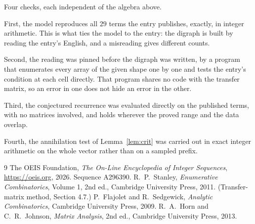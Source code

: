\documentclass[11pt,a4paper]{article}
\theoremstyle{plain}
\theoremstyle{definition}
\begin{document}
Four checks, each independent of the algebra above.

First, the model reproduces all $29$ terms the entry publishes, exactly, in integer
arithmetic. This is what ties the model to the entry: the digraph is built by reading the
entry's English, and a misreading gives different counts.

Second, the reading was pinned before the digraph was written, by a program that enumerates
every array of the given shape one by one and tests the entry's condition at each cell
directly. That program shares no code with the transfer matrix, so an error in one does not
hide an error in the other.

Third, the conjectured recurrence was evaluated directly on the published terms, with no
matrices involved, and holds wherever the proved range and the data overlap.

Fourth, the annihilation test of Lemma~\ref{lem:crit} was carried out in exact integer
arithmetic on the whole vector rather than on a sampled prefix.

\begin{thebibliography}{9}
 The OEIS Foundation, \emph{The On-Line Encyclopedia of Integer
Sequences}, \url{https://oeis.org}, 2026. Sequence A296390.
 R.~P.~Stanley, \emph{Enumerative Combinatorics}, Volume 1, 2nd ed.,
Cambridge University Press, 2011. (Transfer-matrix method, Section 4.7.)
 P.~Flajolet and R.~Sedgewick, \emph{Analytic Combinatorics}, Cambridge
University Press, 2009.
 R.~A.~Horn and C.~R.~Johnson, \emph{Matrix Analysis}, 2nd ed., Cambridge
University Press, 2013.
\end{thebibliography}
\end{document}

